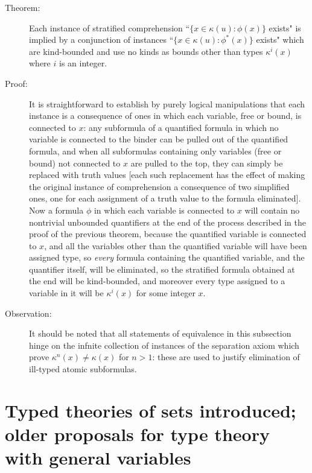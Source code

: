 \documentclass[12pt]{article}
\begin{document}
\begin{description}
\item[Theorem:]  Each instance of stratified comprehension \newline ``$\{x \in \kappa(u):\phi(x)\}$ exists" is implied by  a conjunction of  instances \newline ``$\{x \in \kappa(u):\phi^*(x)\}$ exists" which are kind-bounded and use no kinds as bounds other than types $\kappa^i(x)$ where $i$ is an integer.


\item[Proof:]  It is straightforward to establish by purely logical manipulations that each instance is a consequence of ones in which each variable, free or bound, is connected to $x$: any subformula of a quantified formula in which no variable is connected to the binder can be pulled out of the quantified formula, and when all subformulas containing only variables (free or bound) not connected to $x$ are pulled to the top, they can simply be replaced with truth values [each such replacement  has the effect of making the original instance of comprehension a consequence of two simplified ones, one for each assignment of a truth value to the formula eliminated].  Now a formula $\phi$ in which each variable is connected to $x$ will contain no nontrivial unbounded quantifiers at the end of the process described in the proof of the previous theorem, because the quantified variable is connected to $x$, and all the variables other than the quantified variable will have been assigned type, so {\em every\/} formula containing the quantified variable, and the quantifier itself, will be eliminated, so the stratified formula obtained at the end will be kind-bounded, and moreover every type assigned to a variable in it will be $\kappa^i(x)$ for some integer $x$.

\item[Observation:]  It should be noted that all statements of equivalence in this subsection hinge on
the infnite collection of instances of the separation axiom which prove $\kappa^n(x) \neq \kappa(x)$ for $n>1$:  these are used to justify elimination of ill-typed atomic subformulas.

\end{description}


\newpage

\section{Typed theories of sets introduced;  older proposals for type theory with general variables}
\end{document}
